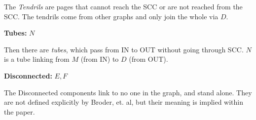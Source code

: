 \documentclass[letterpaper,11pt]{article}
\begin{document}
The \emph{Tendrils} are pages that cannot reach the SCC or are not reached from the SCC\cite{broder2000}.  The tendrils come from other graphs and only join the whole via $D$.

\textbf{Tubes:} $N$

Then there are \emph{tubes}, which pass from IN to OUT without going through SCC\cite{broder2000}.  $N$ is a tube linking from $M$ (from IN) to $D$ (from OUT).

\textbf{Disconnected:}  $E, F$

The Disconnected components link to no one in the graph, and stand alone.  They are not defined explicitly by Broder, et. al, but their meaning is implied within the paper.

\newpage


\end{document}
